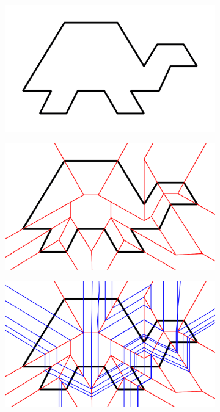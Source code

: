 \documentclass[11pt]{article}
\begin{document}
\begin{figure}[H]
\centering
  \begin{subfigure}[b]{0.18\textwidth}
    \includegraphics[width=\textwidth]{FIGS/Part4/c20}
    \label{fig:c20}
  \end{subfigure}
  \begin{subfigure}[b]{0.18\textwidth}
    \includegraphics[width=\textwidth]{FIGS/Part4/c21}
     \label{fig:c21}
  \end{subfigure}
    \begin{subfigure}[b]{0.18\textwidth}
    \includegraphics[width=\textwidth]{FIGS/Part4/c22}

\end{subfigure}
\end{figure}
\end{document}
